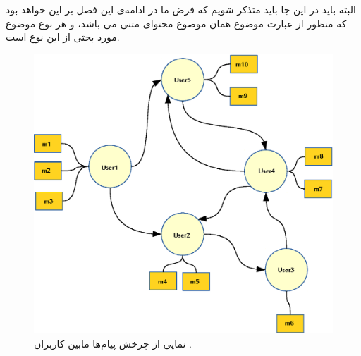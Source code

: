 \indent
البته باید در این جا باید متذکر شویم که فرض ما در ادامه‌ی این فصل بر این خواهد بود که منظور از عبارت موضوع همان موضوع محتوای متنی می باشد، و هر نوع موضوع مورد بحثی از این نوع است.
 \begin{figure}[H]
 \centering
 \includegraphics[scale=0.6]{figures/TOPIC}
 \caption[پیام‌های در چرخش]
 {نمایی از چرخش پیام‌ها مابین کاربران \cite{guille_information_2013}.}
\end{figure}

